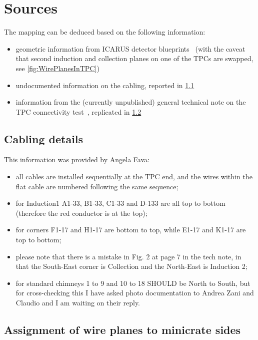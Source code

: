 \section{Sources}
\label{sec:sources}

The mapping can be deduced based on the following information:
\begin{itemize}
  \item geometric information from ICARUS detector blueprints~\cite{SBNDocDB1020}
    (with the caveat that second induction and collection planes on one of the
    TPCs are swapped, see \cref{fig:WirePlanesInTPC})
  \item undocumented information on the cabling, reported in \cref{ssec:CablingInfo}
  \item information from the (currently unpublished) general technical note
    on the TPC connectivity test~\cite{SBNDocDBxxxx:ConnTest},
    replicated in \cref{ssec:PlaneAssignment}
\end{itemize}


\subsection{Cabling details}
\label{ssec:CablingInfo}

This information was provided by Angela Fava:
\begin{itemize}
  \item all cables are installed sequentially at the TPC end, and the wires within the flat cable are numbered following the same sequence;
  \item for Induction1 A1-33, B1-33, C1-33 and D-133 are all top to bottom (therefore the red conductor is at the top);
  \item for corners F1-17 and H1-17 are bottom to top, while E1-17 and K1-17 are top to bottom;
  \item please note that there is a mistake in Fig. 2 at page 7 in the tech note, in that the South-East corner is Collection and the North-East is Induction 2;
  \item for standard chimneys 1 to 9 and 10 to 18 SHOULD be North to South, but for cross-checking this I have asked photo documentation to Andrea Zani and Claudio and I am waiting on their reply.
\end{itemize}


\subsection{Assignment of wire planes to minicrate sides}
\label{ssec:PlaneAssignment}

